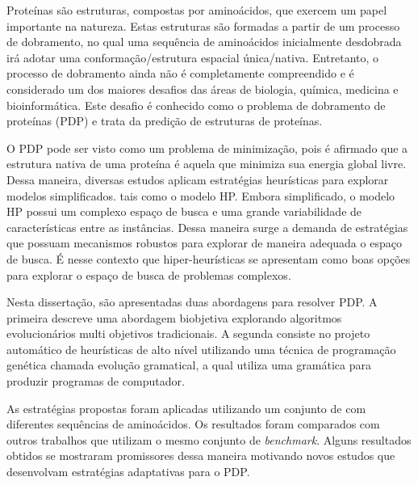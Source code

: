 \begin{resumo}


Proteínas são estruturas, compostas por aminoácidos, que exercem um papel importante na natureza. Estas estruturas são formadas a partir de um processo de dobramento, no qual uma sequência de aminoácidos inicialmente desdobrada irá adotar uma conformação/estrutura espacial única/nativa. Entretanto, o processo de dobramento ainda não é completamente compreendido e é considerado um dos maiores desafios das áreas de biologia, química, medicina e bioinformática. Este desafio é conhecido como o problema de dobramento de proteínas (PDP) e trata da predição de estruturas de proteínas. 

O PDP pode ser visto como um problema de minimização, pois é afirmado que a estrutura nativa de uma proteína é aquela que minimiza sua energia global livre. Dessa maneira, diversas estudos aplicam estratégias heurísticas para explorar modelos simplificados. tais como o modelo HP. Embora simplificado, o modelo HP possui um complexo espaço de busca e uma grande variabilidade de características entre as instâncias. Dessa maneira surge a demanda de estratégias que possuam mecanismos robustos para explorar de maneira adequada o espaço de busca. É nesse contexto que hiper-heurísticas se apresentam como boas opções para explorar o espaço de busca de problemas complexos. 



Nesta dissertação, são apresentadas duas abordagens para resolver PDP. A primeira descreve uma abordagem biobjetiva explorando  algoritmos evolucionários multi objetivos tradicionais. A segunda consiste no projeto automático de heurísticas de alto nível utilizando uma técnica de programação genética chamada evolução gramatical, a qual utiliza uma gramática para produzir programas de computador. 

 As estratégias propostas foram aplicadas utilizando um conjunto de  com diferentes sequências de aminoácidos. Os resultados foram comparados com outros trabalhos que utilizam o mesmo conjunto de \textit{benchmark}. Alguns resultados obtidos se mostraram promissores dessa maneira motivando novos estudos que desenvolvam estratégias adaptativas para o PDP.



\end{resumo}


